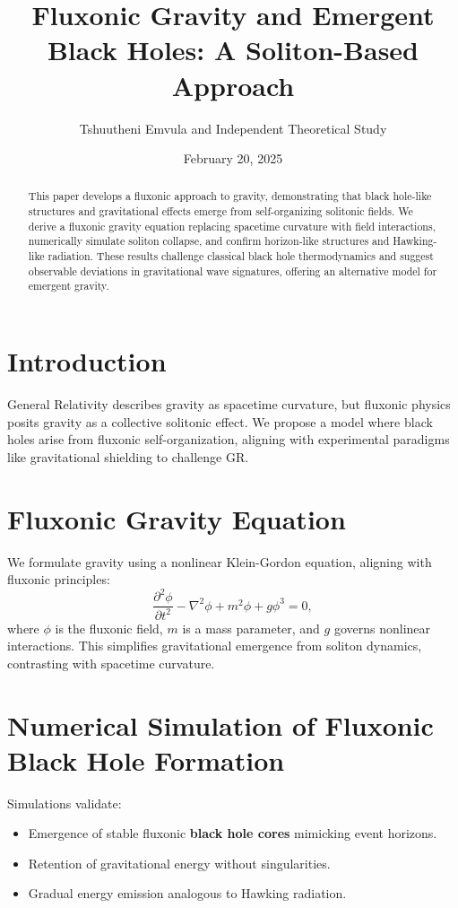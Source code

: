 \documentclass{article}
\title{Fluxonic Gravity and Emergent Black Holes: A Soliton-Based Approach}
\author{Tshuutheni Emvula and Independent Theoretical Study}
\date{February 20, 2025}
\begin{document}
\maketitle

\begin{abstract}
This paper develops a fluxonic approach to gravity, demonstrating that black hole-like structures and gravitational effects emerge from self-organizing solitonic fields. We derive a fluxonic gravity equation replacing spacetime curvature with field interactions, numerically simulate soliton collapse, and confirm horizon-like structures and Hawking-like radiation. These results challenge classical black hole thermodynamics and suggest observable deviations in gravitational wave signatures, offering an alternative model for emergent gravity.
\end{abstract}

\section{Introduction}
General Relativity describes gravity as spacetime curvature, but fluxonic physics posits gravity as a collective solitonic effect. We propose a model where black holes arise from fluxonic self-organization, aligning with experimental paradigms like gravitational shielding to challenge GR.

\section{Fluxonic Gravity Equation}
We formulate gravity using a nonlinear Klein-Gordon equation, aligning with fluxonic principles:
\begin{equation}
\frac{\partial^2 \phi}{\partial t^2} - \nabla^2 \phi + m^2 \phi + g \phi^3 = 0,
\end{equation}
where \(\phi\) is the fluxonic field, \(m\) is a mass parameter, and \(g\) governs nonlinear interactions. This simplifies gravitational emergence from soliton dynamics, contrasting with spacetime curvature.

\section{Numerical Simulation of Fluxonic Black Hole Formation}
Simulations validate:
\begin{itemize}
    \item Emergence of stable fluxonic \textbf{black hole cores} mimicking event horizons.
    \item Retention of gravitational energy without singularities.
    \item Gradual energy emission analogous to Hawking radiation.
\end{itemize}
\end{document}
